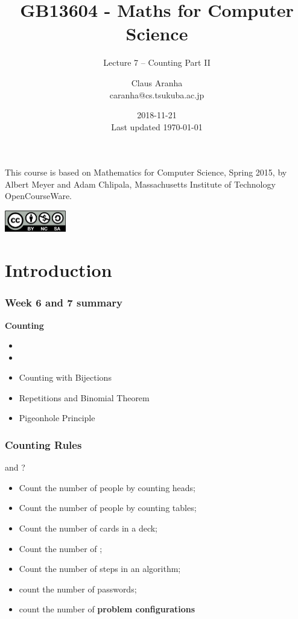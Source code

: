 \documentclass{beamer}
\title[GB13604]{GB13604 - Maths for Computer Science}
\subtitle[]{Lecture 7 -- Counting Part II}
\author[Claus Aranha]{Claus Aranha\\{\footnotesize caranha@cs.tsukuba.ac.jp}}
\institute[COINS]{College of Information Science}
\date[2018-11-21]{2018-11-21\\{\tiny Last updated \today}}
\begin{document}
\begin{frame}
  \maketitle

  \begin{center}
    {\smaller This course is based on Mathematics for Computer Science, Spring
    2015, by Albert Meyer and Adam Chlipala, Massachusetts Institute
    of Technology OpenCourseWare.}
    
    \includegraphics[width=0.2\textwidth]{../img/by-nc-sa}
  \end{center}
\end{frame}

\section{Introduction}

\begin{frame}
  \frametitle{Week 6 and 7 summary}

  {\larger
    {\bf Counting}

    \bigskip

    \begin{itemize}
    \item {}
    \item {}
    \item \alert{Counting with Bijections}
    \item \alert{Repetitions and Binomial Theorem}
    \item \alert{Pigeonhole Principle}
    \end{itemize}
  }
\end{frame}

\begin{frame}
  \frametitle{Counting Rules}
  
  {\larger

     and ?

    \begin{itemize}

    \item Count the number of people by counting heads;
    \item Count the number of people by counting \alert{tables};
    \item Count the number of cards in a deck;
    \item Count the number of ;
    \item Count the number of \alert{steps in an algorithm};
    \item count the number of \alert{passwords};
    \item count the number of {\bf \alert{problem configurations}}
      
    \end{itemize}
  }
\end{frame}
\end{document}
